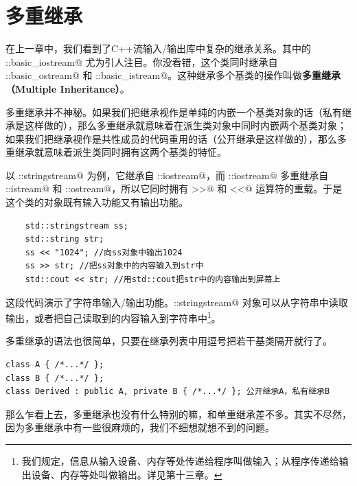 \section{多重继承}
在上一章中，我们看到了C++流输入/输出库中复杂的继承关系。其中的 \lstinline@std::basic_iostream@ 尤为引人注目。你没看错，这个类同时继承自 \lstinline@std::basic_ostream@ 和 \lstinline@std::basic_istream@。这种继承多个基类的操作叫做\textbf{多重继承（Multiple Inheritance）}。\par
多重继承并不神秘。如果我们把继承视作是单纯的内嵌一个基类对象的话（私有继承是这样做的），那么多重继承就意味着在派生类对象中同时内嵌两个基类对象；如果我们把继承视作是共性成员的代码重用的话（公开继承是这样做的），那么多重继承就意味着派生类同时拥有这两个基类的特怔。\par
以 \lstinline@std::stringstream@ 为例，它继承自 \lstinline@std::iostream@，而 \lstinline@std::iostream@ 多重继承自 \lstinline@std::istream@ 和 \lstinline@std::ostream@，所以它同时拥有 \lstinline@>>@ 和 \lstinline@<<@ 运算符的重载。于是这个类的对象既有输入功能又有输出功能。\par
\begin{lstlisting}
    std::stringstream ss;
    std::string str;
    ss << "1024"; //向ss对象中输出1024
    ss >> str; //把ss对象中的内容输入到str中
    std::cout << str; //用std::cout把str中的内容输出到屏幕上
\end{lstlisting}
这段代码演示了字符串输入/输出功能。\lstinline@std::stringstream@ 对象可以从字符串中读取输出，或者把自己读取到的内容输入到字符串中\footnote{我们规定，信息从输入设备、内存等处传递给程序叫做输入；从程序传递给输出设备、内存等处叫做输出。详见第十三章。}。\par
多重继承的语法也很简单，只要在继承列表中用逗号把若干基类隔开就行了。
\begin{lstlisting}
class A { /*...*/ };
class B { /*...*/ };
class Derived : public A, private B { /*...*/ }; 公开继承A，私有继承B
\end{lstlisting}\par
那么乍看上去，多重继承也没有什么特别的嘛，和单重继承差不多。其实不尽然，因为多重继承中有一些很麻烦的，我们不细想就想不到的问题。
